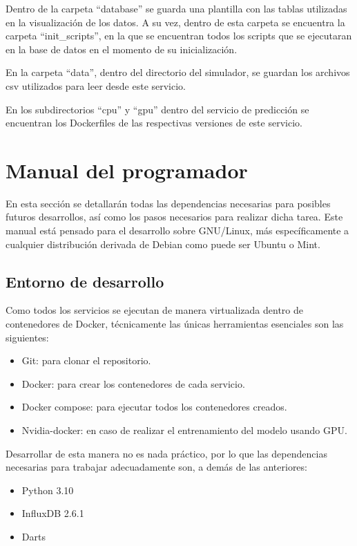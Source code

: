 Dentro de la carpeta ``database'' se guarda una plantilla con las tablas utilizadas en la visualización 
de los datos. A su vez, dentro de esta carpeta se encuentra la carpeta ``init\_scripts'', en la que se encuentran 
todos los scripts que se ejecutaran en la base de datos en el momento de su inicialización.

En la carpeta ``data'', dentro del directorio del simulador, se guardan los archivos csv utilizados para leer desde 
este servicio. 

En los subdirectorios ``cpu'' y ``gpu'' dentro del servicio de predicción se 
encuentran los Dockerfiles de las respectivas versiones de este servicio.

\section{Manual del programador}

En esta sección se detallarán todas las dependencias necesarias para posibles futuros desarrollos, así como
los pasos necesarios para realizar dicha tarea. Este manual está pensado para el desarrollo sobre GNU/Linux,
más específicamente a cualquier distribución derivada de Debian como puede ser Ubuntu o Mint.

\subsection{Entorno de desarrollo}

Como todos los servicios se ejecutan de manera virtualizada dentro de contenedores de Docker, técnicamente las 
únicas herramientas esenciales son las siguientes:
\begin{itemize}
    \item Git: para clonar el repositorio.
    \item Docker: para crear los contenedores de cada servicio.
    \item Docker compose: para ejecutar todos los contenedores creados.
    \item Nvidia-docker: en caso de realizar el entrenamiento del modelo usando GPU.
\end{itemize}

Desarrollar de esta manera no es nada práctico, por lo que las dependencias necesarias para trabajar adecuadamente son, 
a demás de las anteriores:
\begin{itemize}
    \item Python 3.10
    \item InfluxDB 2.6.1
    \item Darts
\end{itemize}

